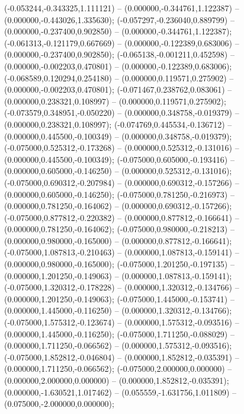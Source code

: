  (-0.053244,-0.343325,1.111121) -- (0.000000,-0.344761,1.122387) -- (0.000000,-0.443026,1.335630);
 (-0.057297,-0.236040,0.889799) -- (0.000000,-0.237400,0.902850) -- (0.000000,-0.344761,1.122387);
 (-0.061313,-0.121179,0.667669) -- (0.000000,-0.122389,0.683006) -- (0.000000,-0.237400,0.902850);
 (-0.065138,-0.001211,0.452598) -- (0.000000,-0.002203,0.470801) -- (0.000000,-0.122389,0.683006);
 (-0.068589,0.120294,0.254180) -- (0.000000,0.119571,0.275902) -- (0.000000,-0.002203,0.470801);
 (-0.071467,0.238762,0.083061) -- (0.000000,0.238321,0.108997) -- (0.000000,0.119571,0.275902);
 (-0.073579,0.348951,-0.050220) -- (0.000000,0.348758,-0.019379) -- (0.000000,0.238321,0.108997);
 (-0.074769,0.445534,-0.136712) -- (0.000000,0.445500,-0.100349) -- (0.000000,0.348758,-0.019379);
 (-0.075000,0.525312,-0.173268) -- (0.000000,0.525312,-0.131016) -- (0.000000,0.445500,-0.100349);
 (-0.075000,0.605000,-0.193416) -- (0.000000,0.605000,-0.146250) -- (0.000000,0.525312,-0.131016);
 (-0.075000,0.690312,-0.207984) -- (0.000000,0.690312,-0.157266) -- (0.000000,0.605000,-0.146250);
 (-0.075000,0.781250,-0.216973) -- (0.000000,0.781250,-0.164062) -- (0.000000,0.690312,-0.157266);
 (-0.075000,0.877812,-0.220382) -- (0.000000,0.877812,-0.166641) -- (0.000000,0.781250,-0.164062);
 (-0.075000,0.980000,-0.218213) -- (0.000000,0.980000,-0.165000) -- (0.000000,0.877812,-0.166641);
 (-0.075000,1.087813,-0.210463) -- (0.000000,1.087813,-0.159141) -- (0.000000,0.980000,-0.165000);
 (-0.075000,1.201250,-0.197135) -- (0.000000,1.201250,-0.149063) -- (0.000000,1.087813,-0.159141);
 (-0.075000,1.320312,-0.178228) -- (0.000000,1.320312,-0.134766) -- (0.000000,1.201250,-0.149063);
 (-0.075000,1.445000,-0.153741) -- (0.000000,1.445000,-0.116250) -- (0.000000,1.320312,-0.134766);
 (-0.075000,1.575312,-0.123674) -- (0.000000,1.575312,-0.093516) -- (0.000000,1.445000,-0.116250);
 (-0.075000,1.711250,-0.088029) -- (0.000000,1.711250,-0.066562) -- (0.000000,1.575312,-0.093516);
 (-0.075000,1.852812,-0.046804) -- (0.000000,1.852812,-0.035391) -- (0.000000,1.711250,-0.066562);
 (-0.075000,2.000000,0.000000) -- (0.000000,2.000000,0.000000) -- (0.000000,1.852812,-0.035391);
 (0.000000,-1.630521,1.017462) -- (0.055559,-1.631756,1.011809) -- (0.075000,-2.000000,0.000000);
